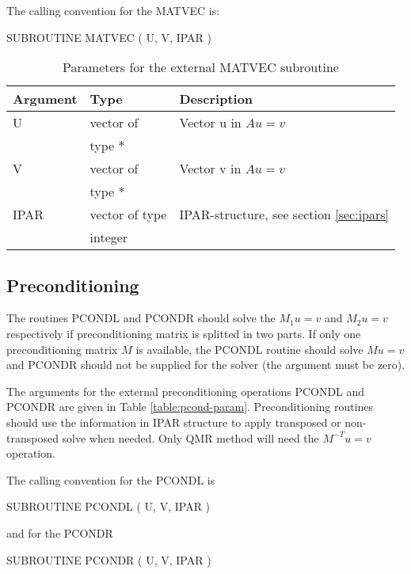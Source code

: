 \documentclass[11pt,a4paper,english,oneside]{report}
\begin{document}
The calling convention for the {\ttfamily MATVEC} is:

\bigskip
\noindent
{\ttfamily SUBROUTINE MATVEC ( U, V, IPAR )}
\bigskip

\begin{table}[H]
\begin{tabular*}{\textwidth}{lll}
\hline\hline
{\bfseries Argument} & {\bfseries Type} & {\bfseries Description} \\
\hline
U	& vector of 		& Vector u in $Au = v$ \\
	& type $*$		& \\
V 	& vector of		& Vector v in $Au = v$ \\
	& type $*$		& \\
IPAR	& vector of type	& IPAR-structure, see section \ref{sec:ipars} \\
	& integer		& \\
\hline\hline
\end{tabular*}
\caption{Parameters for the external MATVEC subroutine}
\label{table:matvec-param}
\end{table}

\subsection{Preconditioning}

The routines {\ttfamily PCONDL} and {\ttfamily PCONDR} should solve
the $M_{1}u = v$ and $M_{2}u = v$ respectively if preconditioning
matrix is splitted in two parts. If only one preconditioning matrix $M$ is
available, the {\ttfamily PCONDL} routine should solve $Mu = v$ and
{\ttfamily PCONDR} should not be supplied for the solver (the argument must
be zero).
 
The arguments for the external preconditioning operations
{\ttfamily PCONDL} and {\ttfamily PCONDR} are given in
Table \ref{table:pcond-param}. Preconditioning routines should use the
information in {\ttfamily IPAR} structure to apply transposed or
non-transposed solve when needed. Only QMR method will need the
$M^{-T}u = v$ operation.

The calling convention for the {\ttfamily PCONDL} is

\bigskip
\noindent
{\ttfamily SUBROUTINE PCONDL ( U, V, IPAR )}
\bigskip

\noindent
and for the {\ttfamily PCONDR}

\bigskip
\noindent
{\ttfamily SUBROUTINE PCONDR ( U, V, IPAR )}
\bigskip
\end{document}
